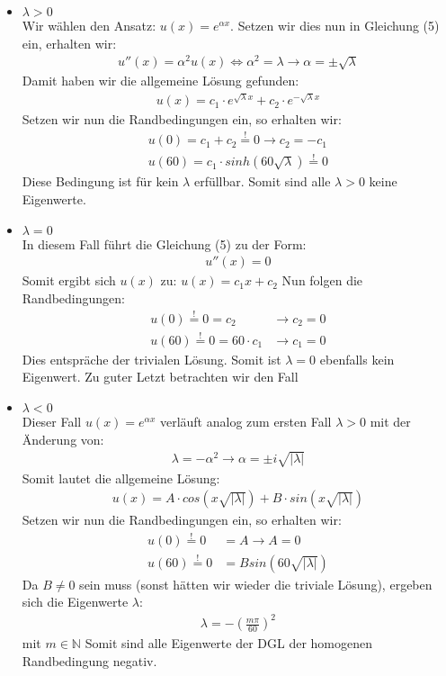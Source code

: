 \documentclass[ngerman]{scrartcl}
\begin{document}
	\begin{itemize}
		\item $\lambda > 0$\\
			Wir wählen den Ansatz: $u(x) = e^{\alpha x}$. Setzen wir dies nun in Gleichung (5) ein, erhalten wir: 
			\begin{align*}
				u''(x) = \alpha^2 u(x) \Leftrightarrow \alpha^2 = \lambda \rightarrow \alpha = \pm \sqrt{\lambda}
			\end{align*}
			Damit haben wir die allgemeine Lösung gefunden: 
			\begin{align}
				u(x) = c_1 \cdot e^{\sqrt{\lambda} x} + c_2 \cdot e^{-\sqrt{\lambda} x}
			\end{align}
			Setzen wir nun die Randbedingungen ein, so erhalten wir: 
			\begin{align*}
				u(0) = c_1 + c_2 \overset{!}{=} 0 \rightarrow c_2 = - c_1\\
				u(60) = c_1 \cdot sinh(60 \sqrt{\lambda}) \overset{!}{=} 0
			\end{align*}
			Diese Bedingung ist für kein $\lambda$ erfüllbar. Somit sind alle $\lambda > 0$ keine Eigenwerte. 
		\item $\lambda = 0$\\
			In diesem Fall führt die Gleichung (5) zu der Form:
			\begin{align*}
				u''(x) = 0
			\end{align*}
				Somit ergibt sich $u(x)$ zu: $u(x) = c_1 x +c_2$ Nun folgen die Randbedingungen: 
			\begin{align*}
				u(0) \overset{!}{=} 0 = c_2 &\rightarrow c_2 = 0\\
				u(60) \overset{!}{=} 0= 60 \cdot c_1 &\rightarrow c_1 = 0
			\end{align*}
			Dies entspräche der trivialen Lösung. Somit ist $\lambda = 0$ ebenfalls kein Eigenwert.
			Zu guter Letzt betrachten wir den Fall
		\item $\lambda < 0$\\
			Dieser Fall $u(x) = e^{\alpha x}$ verläuft analog zum ersten Fall $\lambda > 0$ mit der Änderung von:
			\begin{align*}
				\lambda = - \alpha^2 \rightarrow \alpha = \pm i \sqrt{|\lambda|}
			\end{align*}
			Somit lautet die allgemeine Lösung:
			\begin{align*}
				u(x) = A \cdot cos\left(x\sqrt{|\lambda|}\right) + B \cdot sin\left(x\sqrt{|\lambda|} \right)
			\end{align*}
			Setzen wir nun die Randbedingungen ein, so erhalten wir: 
			\begin{align*}
				u(0) \overset{!}{=} 0 &= A  \rightarrow A = 0\\
				u(60) \overset{!}{=} 0 &= B sin(60 \sqrt{|\lambda|})
			\end{align*}
			Da $B \neq 0$ sein muss (sonst hätten wir wieder die triviale Lösung), ergeben sich die Eigenwerte $\lambda$: 
			\begin{align*}
				\lambda = -\left(\frac{m \pi}{60}\right)^2
			\end{align*} mit $m \in \mathbb{N}$
			Somit sind alle Eigenwerte der DGL der homogenen Randbedingung negativ.
	\end{itemize}
\end{document}
